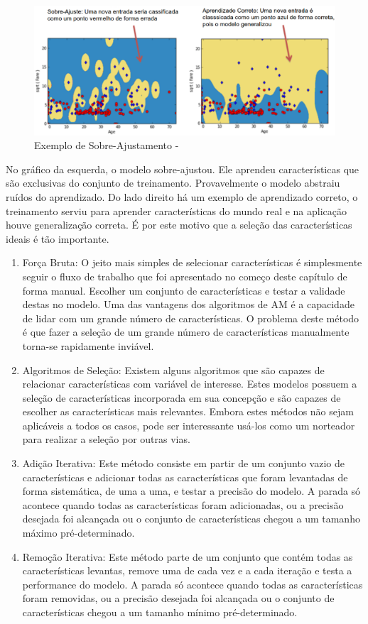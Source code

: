 \begin{figure}[!h]
\centering
\includegraphics[keepaspectratio=true,scale=0.40]
{figuras/overfitting.eps}
\caption{Exemplo de Sobre-Ajustamento - \cite{real2013}}
\label{over}
\end{figure}

No gráfico da esquerda, o modelo sobre-ajustou. Ele aprendeu características que são exclusivas do conjunto de treinamento. Provavelmente o modelo abstraiu ruídos do aprendizado. Do lado direito há um exemplo de aprendizado correto, o treinamento serviu para aprender características do mundo real e na aplicação houve generalização correta. É por este motivo que a seleção das características ideais é tão importante.
\begin{enumerate}
\item Força Bruta: O jeito mais simples de selecionar características é simplesmente seguir o fluxo de trabalho que foi apresentado no começo deste capítulo de forma manual. Escolher um conjunto de características e testar a validade destas no modelo. Uma das vantagens dos algoritmos de AM é a capacidade de lidar com um grande número de características. O problema deste método é que fazer a seleção de um grande número de características manualmente torna-se rapidamente inviável. 
\item Algoritmos de Seleção: Existem alguns algoritmos que são capazes de relacionar características com variável de interesse. Estes modelos possuem a seleção de características incorporada em sua concepção e são capazes de escolher as características mais relevantes. Embora estes métodos não sejam aplicáveis a todos os casos, pode ser interessante usá-los como um norteador para realizar a seleção por outras vias. 
\item Adição Iterativa: Este método consiste em partir de um conjunto vazio de características e adicionar todas as características que foram levantadas de forma sistemática, de uma a uma, e testar a precisão do modelo. A parada só acontece quando todas as características foram adicionadas, ou a precisão desejada foi alcançada ou o conjunto de características chegou a um tamanho máximo pré-determinado.
\item Remoção Iterativa: Este método parte de um conjunto que contém todas as características levantas, remove uma de cada vez e a cada iteração e testa a performance do modelo. A parada só acontece quando todas as características foram removidas, ou a precisão desejada foi alcançada ou o conjunto de características chegou a um tamanho mínimo pré-determinado.
\end{enumerate}

